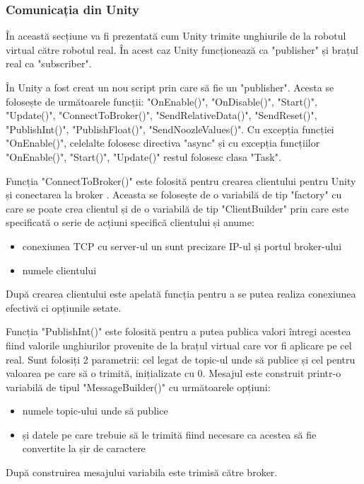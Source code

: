 \subsubsection{Comunicația din Unity}

În această secțiune va fi prezentată cum Unity trimite unghiurile de la robotul virtual către robotul real. În acest caz Unity funcționează ca "publisher" și brațul real ca "subscriber".

În Unity a fost creat un nou script prin care să fie un "publisher". Acesta se folosește de următoarele funcții: "OnEnable()", "OnDisable()", "Start()", "Update()", "ConnectToBroker()", "SendRelativeData()", "SendReset()", "PublishInt()", "PublishFloat()", "SendNoozleValues()". Cu excepția funcției "OnEnable()", celelalte folosesc directiva "async" și cu excepția funcțiilor "OnEnable()", "Start()", "Update()" restul folosesc clasa "Task".

Funcția  "ConnectToBroker()" este folosită pentru crearea clientului pentru Unity și conectarea  la broker . Aceasta se folosește de o variabilă de tip "factory" cu care se poate crea clientul și de o variabilă de tip "ClientBuilder" prin care este specificată o serie de acțiuni specifică clientului și anume: 



\begin{itemize}
	\item conexiunea TCP cu server-ul un sunt precizare IP-ul și portul broker-ului
	\item numele clientului
\end{itemize}
După crearea clientului este apelată funcția pentru a se putea realiza conexiunea efectivă ci opțiunile setate.

Funcția  "PublishInt()" este folosită pentru a putea publica valori întregi acestea fiind valorile unghiurilor provenite de la brațul virtual care vor fi aplicare pe cel real. Sunt folosiți 2 parametrii: cel legat de topic-ul unde să publice și cel pentru valoarea pe care să o trimită, inițializate cu 0. Mesajul este construit printr-o variabilă de tipul "MessageBuilder()" cu următoarele opțiuni:
\begin{itemize}
	\item numele topic-ului unde să publice 
	\item și datele pe care trebuie să le trimită fiind necesare ca acestea să fie convertite la șir de caractere
\end{itemize}
După construirea mesajului variabila este trimisă către broker.
 
